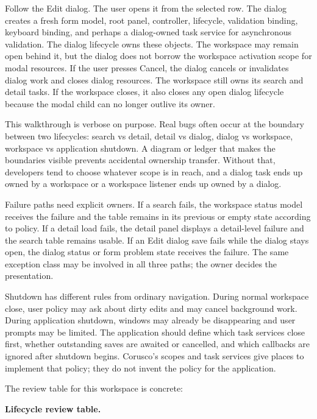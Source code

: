 Follow the Edit dialog. The user opens it from the selected row. The dialog
creates a fresh form model, root panel, controller, lifecycle, validation
binding, keyboard binding, and perhaps a dialog-owned task service for
asynchronous validation. The dialog lifecycle owns these objects. The
workspace may remain open behind it, but the dialog does not borrow the
workspace activation scope for modal resources. If the user presses Cancel,
the dialog cancels or invalidates dialog work and closes dialog resources. The
workspace still owns its search and detail tasks. If the workspace closes, it
also closes any open dialog lifecycle because the modal child can no longer
outlive its owner.

This walkthrough is verbose on purpose. Real bugs often occur at the boundary
between two lifecycles: search vs detail, detail vs dialog, dialog vs
workspace, workspace vs application shutdown. A diagram or ledger that makes
the boundaries visible prevents accidental ownership transfer. Without that,
developers tend to choose whatever scope is in reach, and a dialog task ends up
owned by a workspace or a workspace listener ends up owned by a dialog.

Failure paths need explicit owners. If a search fails, the workspace status
model receives the failure and the table remains in its previous or empty
state according to policy. If a detail load fails, the detail panel displays a
detail-level failure and the search table remains usable. If an Edit dialog
save fails while the dialog stays open, the dialog status or form problem state
receives the failure. The same exception class may be involved in all three
paths; the owner decides the presentation.

Shutdown has different rules from ordinary navigation. During normal workspace
close, user policy may ask about dirty edits and may cancel background work.
During application shutdown, windows may already be disappearing and user
prompts may be limited. The application should define which task services close
first, whether outstanding saves are awaited or cancelled, and which callbacks
are ignored after shutdown begins. Corusco's scopes and task services give
places to implement that policy; they do not invent the policy for the
application.

The review table for this workspace is concrete:

\begin{center}
\textbf{Lifecycle review table.}
\end{center}

